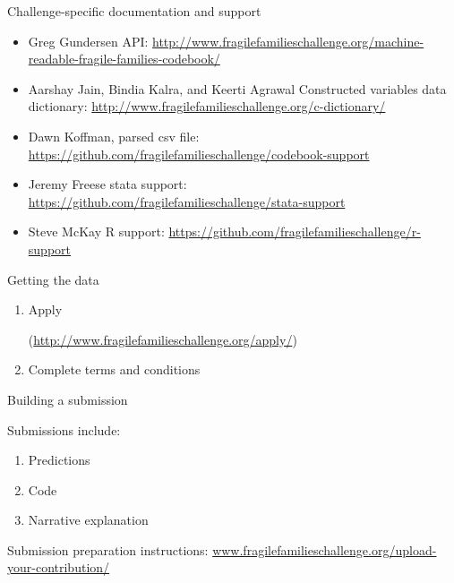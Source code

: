 \documentclass{beamer}
\begin{document}
\begin{frame}{Challenge-specific documentation and support}

\begin{itemize}
\item Greg Gundersen API: \url{http://www.fragilefamilieschallenge.org/machine-readable-fragile-families-codebook/}
\pause 
\item Aarshay Jain, Bindia Kalra, and Keerti Agrawal Constructed variables data dictionary: \url{http://www.fragilefamilieschallenge.org/c-dictionary/} 
\pause
\item Dawn Koffman, parsed csv file: \url{https://github.com/fragilefamilieschallenge/codebook-support}
\pause
\item Jeremy Freese stata support: \url{https://github.com/fragilefamilieschallenge/stata-support}
\pause
\item Steve McKay R support: \url{https://github.com/fragilefamilieschallenge/r-support}
\end{itemize}

\end{frame}
\begin{frame}{Getting the data}

\begin{enumerate}
\item Apply \begin{scriptsize}(\textcolor{blue}{\url{http://www.fragilefamilieschallenge.org/apply/}})\end{scriptsize}
\item Complete terms and conditions
\end{enumerate}

\end{frame}
\begin{frame}{Building a submission}

Submissions include:
\begin{enumerate}
\item Predictions
\item Code
\item Narrative explanation
\end{enumerate}

\vfill
Submission preparation instructions: \textcolor{blue}{\href{http://www.fragilefamilieschallenge.org/upload-your-contribution/}{www.fragilefamilieschallenge.org/upload-your-contribution/}}

\end{frame}
\end{document}
